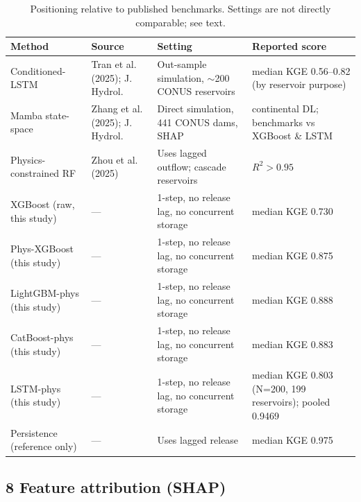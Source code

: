 \documentclass[journal]{ascelike-new}
\begin{document}
\begin{table}[t]
  \centering
  \caption{Positioning relative to published benchmarks. Settings are not directly comparable; see text.}
  \begin{tabularx}{\textwidth}{l X X l}
    \toprule
    Method & Source & Setting & Reported score \\
    \midrule
    Conditioned-LSTM & Tran et al. (2025); J. Hydrol. & Out-sample simulation, $\sim$200 CONUS reservoirs & median KGE 0.56--0.82 (by reservoir purpose) \\
    Mamba state-space & Zhang et al. (2025); J. Hydrol. & Direct simulation, 441 CONUS dams, SHAP & continental DL; benchmarks vs XGBoost \& LSTM \\
    Physics-constrained RF & Zhou et al. (2025) & Uses lagged outflow; cascade reservoirs & $R^2 > 0.95$ \\
    XGBoost (raw, this study) & --- & 1-step, no release lag, no concurrent storage & median KGE 0.730 \\
    Phys-XGBoost (this study) & --- & 1-step, no release lag, no concurrent storage & median KGE 0.875 \\
    LightGBM-phys (this study) & --- & 1-step, no release lag, no concurrent storage & median KGE 0.888 \\
    CatBoost-phys (this study) & --- & 1-step, no release lag, no concurrent storage & median KGE 0.883 \\
    LSTM-phys (this study) & --- & 1-step, no release lag, no concurrent storage & median KGE 0.803 (N=200, 199 reservoirs); pooled 0.9469 \\
    Persistence (reference only) & --- & Uses lagged release & median KGE 0.975 \\
    \bottomrule
  \end{tabularx}
\end{table}


\subsection{8 Feature attribution (SHAP)}
\end{document}
